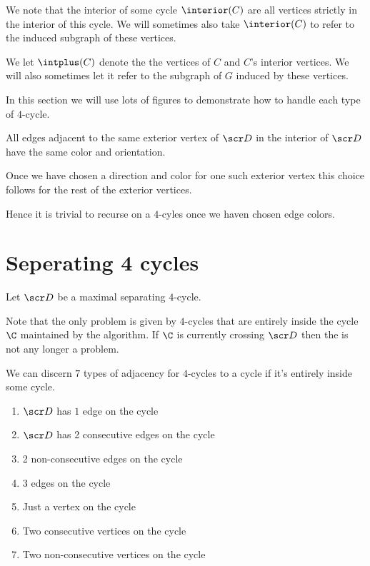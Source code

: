 
\newcommand{\D}{\scr D}


We note that the interior of some cycle $\interior(C)$ are all vertices strictly in the interior of this cycle. We will sometimes also take $\interior(C)$ to refer to the induced subgraph of these vertices.

We let $\intplus(C)$ denote the the vertices of $C$ and $C$'s interior vertices. We will also sometimes let it refer to the subgraph of $G$ induced by these vertices.


In this section we will use lots of figures to demonstrate how to handle each type of $4$-cycle.

All edges adjacent to the same exterior vertex of $\D$ in the interior of $\D$ have the same color and orientation.

Once we have chosen a direction and color for one such exterior vertex this choice follows for the rest of the exterior vertices.

Hence it is trivial to recurse on a $4$-cyles once we haven chosen edge colors.

\section{Seperating 4 cycles}
Let $\D$ be a maximal separating $4$-cycle.

Note that the only problem is given by $4$-cycles that are entirely inside the cycle $\C$ maintained by the algorithm. If $\C$ is currently crossing $\D$ then the is not any longer a problem.

We can discern $7$ types of adjacency for $4$-cycles to a cycle if it's entirely inside some cycle.
\begin{enumerate}
  \renewcommand*{\labelenumi}{(\alph{enumi})}%
  \renewcommand*{\theenumi}{(\alph{enumi})}%

  \item $\D$ has $1$ edge on the cycle
  \label{t:1}
  \item $\D$ has 2 consecutive edges on the cycle
  \label{t:2cons}
  \item 2 non-consecutive edges on the cycle
  \label{t:2alt}
  \item 3 edges on the cycle
  \label{t:3}
  \item Just a vertex on the cycle
  \label{t:v1}
  \item Two consecutive vertices on the cycle
  \label{t:v2cons}
  \item Two non-consecutive vertices on the cycle
  \label{t:v2alt}
\end{enumerate}


